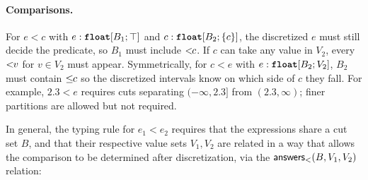 %
%


\paragraph{Comparisons.} 
For $e < c$ with $e : \textnormal{\ttfamily\bfseries float}[B_1; \top]$ and $c : \textnormal{\ttfamily\bfseries float}[B_2; \{c\}]$, the discretized $e$ must still decide the predicate, so $B_1$ must include $<\!\!{c}$. If $c$ can take any value in $V_2$, every $<\!\!{v}$ for $v\in V_2$ must appear. Symmetrically, for $c < e$ with $e : \textnormal{\ttfamily\bfseries float}[B_2; V_2]$, $B_2$ must contain $\leq\!\!{c}$ so the discretized intervals know on which side of $c$ they fall. For example, $2.3<e$ requires cuts separating $(-\infty,2.3]$ from $(2.3,\infty)$; finer partitions are allowed but not required.


In general, the typing rule for $e_1 < e_2$ requires that the expressions share a cut set $B$, and that their respective value sets $V_1, V_2$ are related in a way that allows the comparison to be determined after discretization, via the $\mathsf{answers}_<(B, V_1, V_2)$ relation:

